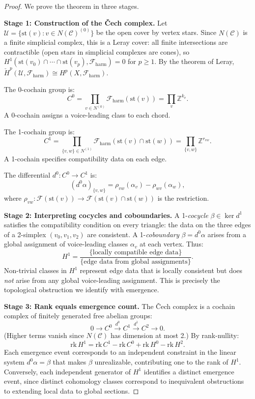 \documentclass[12pt,a4paper]{article}
\newcommand{\ZZ}{\mathbb{Z}}
\newcommand{\Hone}{H^{1}}
\newcommand{\Hzero}{H^{0}}
\newcommand{\Htwo}{H^{2}}
\newcommand{\sheaf}{\mathscr{F}}
\newcommand{\Cech}{\check{H}}
\begin{document}
\begin{proof}
  We prove the theorem in three stages.

  \textbf{Stage 1: Construction of the \v{C}ech complex.}
  Let $\mathcal{U} = \{\mathrm{st}(v) : v \in N(\mathcal{C})^{(0)}\}$ be the open cover 
  by vertex stars. Since $N(\mathcal{C})$ is a finite simplicial complex, this is a 
  Leray cover: all finite intersections are contractible (open stars in simplicial complexes 
  are cones), so $\Hone(\mathrm{st}(v_0) \cap \cdots \cap \mathrm{st}(v_p), \sheaf_{\mathrm{harm}}) = 0$ 
  for $p \geq 1$. By the theorem of Leray, $\Cech^p(\mathcal{U}, \sheaf_{\mathrm{harm}}) 
  \cong H^p(X, \sheaf_{\mathrm{harm}})$.

  The 0-cochain group is:
  \[
    C^0 = \prod_{v \in N^{(0)}} \sheaf_{\mathrm{harm}}(\mathrm{st}(v)) 
    = \prod_{v} \ZZ^{k_v}.
  \]
  A 0-cochain assigns a voice-leading class to each chord.

  The 1-cochain group is:
  \[
    C^1 = \prod_{\{v,w\} \in N^{(1)}} \sheaf_{\mathrm{harm}}(\mathrm{st}(v) \cap \mathrm{st}(w)) 
    = \prod_{\{v,w\}} \ZZ^{r_{vw}}.
  \]
  A 1-cochain specifies compatibility data on each edge.

  The differential $d^0\colon C^0 \to C^1$ is:
  \[
    (d^0 \alpha)_{\{v,w\}} = \rho_{vw}(\alpha_v) - \rho_{wv}(\alpha_w),
  \]
  where $\rho_{vw}\colon \sheaf(\mathrm{st}(v)) \to \sheaf(\mathrm{st}(v) \cap \mathrm{st}(w))$ 
  is the restriction.

  \textbf{Stage 2: Interpreting cocycles and coboundaries.}
  A 1-\emph{cocycle} $\beta \in \ker d^1$ satisfies the compatibility condition on every 
  triangle: the data on the three edges of a 2-simplex $(v_0, v_1, v_2)$ are consistent. 
  A 1-\emph{coboundary} $\beta = d^0 \alpha$ arises from a global assignment of voice-leading 
  classes $\alpha_v$ at each vertex. Thus:
  \[
    \Hone = \frac{\{\text{locally compatible edge data}\}}{\{\text{edge data from global assignments}\}}.
  \]
  Non-trivial classes in $\Hone$ represent edge data that is locally consistent but does 
  \emph{not} arise from any global voice-leading assignment. This is precisely the 
  topological obstruction we identify with emergence.

  \textbf{Stage 3: Rank equals emergence count.}
  The \v{C}ech complex is a cochain complex of finitely generated free abelian groups:
  \[
    0 \to C^0 \xrightarrow{d^0} C^1 \xrightarrow{d^1} C^2 \to 0.
  \]
  (Higher terms vanish since $N(\mathcal{C})$ has dimension at most 2.) 
  By rank-nullity:
  \[
    \mathrm{rk}\, \Hone = \mathrm{rk}\, C^1 - \mathrm{rk}\, C^0 + \mathrm{rk}\, \Hzero 
    - \mathrm{rk}\, \Htwo.
  \]
  Each emergence event corresponds to an independent constraint in the linear system 
  $d^0 \alpha = \beta$ that makes $\beta$ unrealizable, contributing one to the rank 
  of $\Hone$. Conversely, each independent generator of $\Hone$ identifies a distinct 
  emergence event, since distinct cohomology classes correspond to inequivalent obstructions 
  to extending local data to global sections.


\end{proof}
\end{document}
